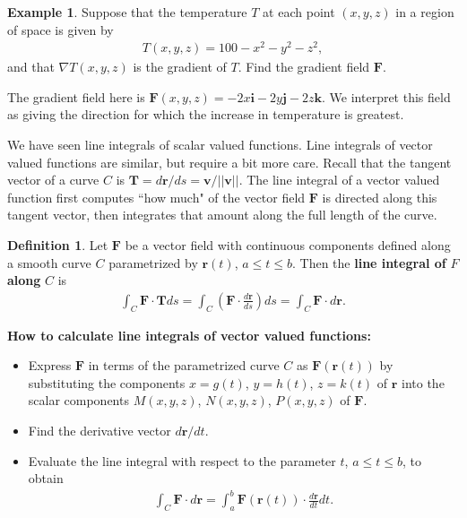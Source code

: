 \documentclass[12pt, letter]{article}
\theoremstyle{plain}
\numberwithin{theorem}{section}
\theoremstyle{definition}
\newtheorem{definition}[theorem]{Definition}
\newtheorem{example}[theorem]{Example}
\begin{document}
\bigskip

\hrulefill

\bigskip

\begin{example}
Suppose that the temperature $T$ at each point $(x,y,z)$ in a region of space is given by
\begin{align*}
T(x,y,z) = 100-x^2-y^2-z^2,
\end{align*}
and that $\nabla T(x,y,z)$ is the gradient of $T$. Find the gradient field $\bm{F}$.

\bigskip

The gradient field here is $\bm{F}(x,y,z) = -2x\bm{i}-2y\bm{j}-2z\bm{k}$. We interpret this field as giving the direction for which the increase in temperature is greatest.
\end{example}

\bigskip

\hrulefill

\bigskip

We have seen line integrals of scalar valued functions. Line integrals of vector valued functions are similar, but require a bit more care. Recall that the tangent vector of a curve $C$ is $\bm{T} = d\bm{r}/ds = \bm{v} / ||\bm{v}||$. The line integral of a vector valued function first computes ``how much" of the vector field $\bm{F}$ is directed along this tangent vector, then integrates that amount along the full length of the curve.

\bigskip

\begin{definition}
Let $\bm{F}$ be a vector field with continuous components defined along a smooth curve $C$ parametrized by $\bm{r}(t)$, $a\leq t \leq b$. Then the \textbf{line integral of} $F$ \textbf{along} $C$ is
\begin{align*}
\int_C \bm{F}\cdot \bm{T}ds = \int_C \left(\bm{F}\cdot\frac{d\bm{r}}{ds}\right)ds = \int_C \bm{F}\cdot d\bm{r}.
\end{align*}
\end{definition}

\bigskip

\hrulefill

\bigskip

\textbf{How to calculate line integrals of vector valued functions:}
\begin{itemize}
\item[1.] Express $\bm{F}$ in terms of the parametrized curve $C$ as $\bm{F}(\bm{r}(t))$ by substituting the components $x=g(t)$, $y=h(t)$, $z=k(t)$ of $\bm{r}$ into the scalar components $M(x,y,z)$, $N(x,y,z)$, $P(x,y,z)$ of $\bm{F}$.
\item[2.] Find the derivative vector $d\bm{r}/dt$.
\item[3.] Evaluate the line integral with respect to the parameter $t$, $a\leq t \leq b$, to obtain
\begin{align*}
\int_C \bm{F} \cdot d\bm{r} = \int_a^b \bm{F}(\bm{r}(t))\cdot \frac{d\bm{r}}{dt} dt.
\end{align*}
\end{itemize}
\end{document}
